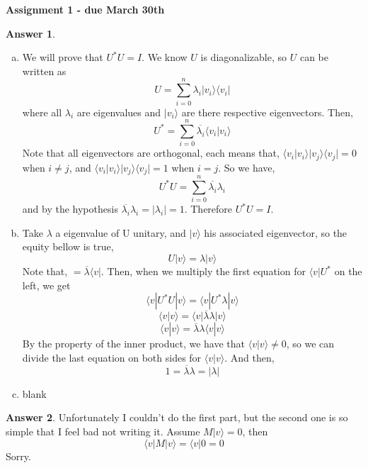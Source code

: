 \documentclass[12pt]{article}
\newcommand{\ket}[1]{|#1\rangle}
\newcommand{\bra}[1]{\langle#1|}
\newcommand{\ketbra}[2]{| #1 \rangle \langle #2 |}
\newcommand{\braket}[2]{\langle  #1 |#2 \rangle}
\theoremstyle{plain}
\theoremstyle{definition}
\newtheorem{ans}{Answer}
\begin{document}
\begin{center}
\Large \textbf{{Assignment 1 - due March 30th}}
\end{center} 


\begin{ans}
\begin{enumerate}[(a)]
 	\item We will prove that $U^{*}U = I$. We know $U$ is diagonalizable, so $U$ can be written as \[U = \sum_{i=0}^{n} \lambda_i \ketbra{v_i}{v_i}\] where
			all $\lambda_i$ are eigenvalues and $\ket{v_i}$ are there respective eigenvectors. 
			Then, \[ U^{*} = \sum_{i=0}^{n} \overline{\lambda_i} \braket{v_i}{v_i}\]
			Note that all eigenvectors are orthogonal, each means that, $\braket{v_i}{v_i} \ketbra{v_j}{v_j} = 0$ when $i \neq j$, and $\braket{v_i}{v_i} \ketbra{v_j}{v_j} = 1$
			when $i = j$. So we have, \[ U^{*}U = \sum_{i=0}^{n} \overline{\lambda_i} \lambda_i\] and by the hypothesis
			$\overline{\lambda_i} \lambda_i = \left\lvert \lambda_i \right\rvert = 1$. Therefore $ U^{*}U = I$.
 	\item Take $\lambda$ a eigenvalue of U unitary, and $\ket{v}$ his associated eigenvector, so the equity bellow
			is true, \[ U \ket{v} = \lambda\ket{v} \]
			Note that, $ = \overline{\lambda}\bra{v}$.
			Then, when we multiply the first equation for $\bra{v}U^{*}$ on the left, we get 
			\[ \bra{v}U^{*} U \ket{v} = \bra{v}U^{*} \lambda \ket{v}\]
			\[ \braket{v}{v} = \bra{v}\overline{\lambda}\lambda \ket{v}\]
			\[ \braket{v}{v} = \overline{\lambda}\lambda \braket{v}{v}\]
			By the property of the inner product, we have that $\braket{v}{v} \neq 0$, so we can divide the last
			equation on both sides for $\braket{v}{v}$. And then, 
			\[ 1 = \overline{\lambda}\lambda = \left\lvert \lambda \right\rvert\]
 	\item blank
 \end{enumerate}
 
\end{ans}

\noindent \hrulefill

\begin{ans}
	Unfortunately I couldn't do the first part, but the second one is so simple that I feel bad not writing it.
	Assume $M \ket{v} = 0$, then
	\[ \bra{v} M \ket{v} = \bra{v} 0 = 0\]
	Sorry.
\end{ans}

\noindent \hrulefill
\end{document}
